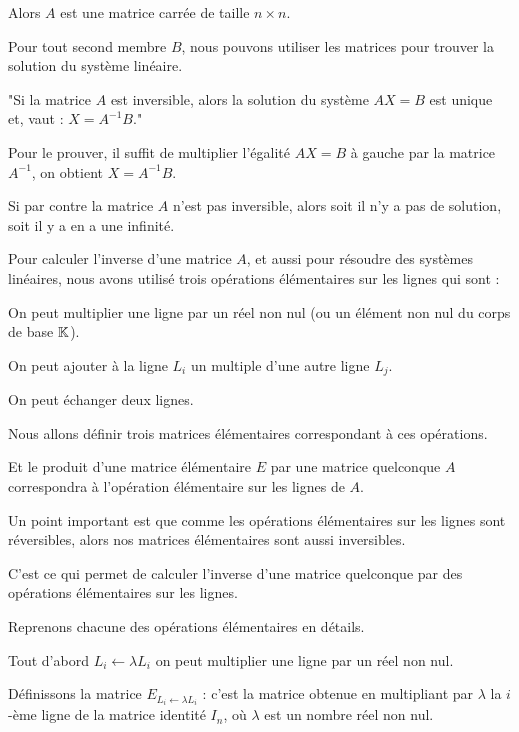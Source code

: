 Alors $A$ est une matrice carrée de taille $n\times n$.

\change
Pour tout second membre $B$, nous pouvons utiliser les matrices 
pour trouver la solution du système linéaire.

"Si la matrice $A$ est inversible, alors
la solution du système $AX=B$ est unique et, vaut :
$X = A^{-1}B$."

\change
Pour le prouver, il suffit de multiplier l'égalité $AX=B$
à gauche par la matrice $A^{-1}$, on obtient $X = A^{-1}B$.

Si par contre la matrice $A$ n'est pas inversible,
alors soit il n'y a pas de solution, soit il y a en a une infinité.


\diapo


Pour calculer l'inverse d'une matrice $A$, et aussi pour résoudre des systèmes linéaires,
nous avons utilisé trois opérations élémentaires sur les lignes qui sont :
 
\change
  On peut multiplier une ligne par un réel non nul (ou un élément non nul du corps de base $\mathbb{K}$).
    
  On peut ajouter à la ligne $L_i$ un multiple d'une autre ligne $L_j$.
  
  On peut échanger deux lignes.
  
\change
Nous allons définir trois matrices élémentaires correspondant à ces opérations. 

\change
Et le produit d'une matrice élémentaire $E$ par une matrice quelconque $A$ correspondra 
à l'opération élémentaire sur les lignes de $A$. 

\change
Un point important est que comme les opérations élémentaires sur les lignes sont réversibles,
alors nos matrices élémentaires sont aussi inversibles.

C'est ce qui permet de calculer l'inverse d'une matrice quelconque 
par des opérations élémentaires sur les lignes.



\diapo

Reprenons chacune des opérations élémentaires en détails.

Tout d'abord $L_i \leftarrow \lambda L_i$ on peut multiplier une ligne par un réel non nul.


  
\change
 Définissons la matrice $E_{L_i \leftarrow \lambda L_i}$ : c'est la matrice obtenue en 
    multipliant par $\lambda$ la $i$-ème ligne de la matrice identité $I_n$, 
    où $\lambda$ est un nombre réel non nul.
    
